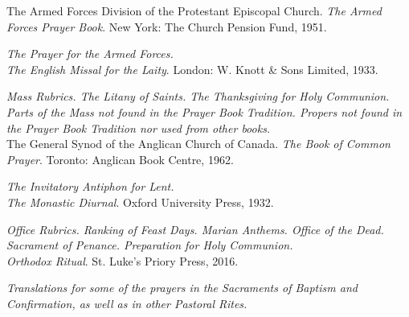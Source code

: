 The Armed Forces Division of the Protestant Episcopal Church. \textit{The Armed Forces Prayer Book}. New York: The Church Pension Fund, 1951.\par\noindent
\textit{The Prayer for the Armed Forces.}\\

\clearpage
\textit{The English Missal for the Laity}. London: W. Knott \& Sons Limited, 1933.\par\noindent
\textit{Mass Rubrics. The Litany of Saints. The Thanksgiving for Holy Communion. Parts of the Mass not found in the Prayer Book Tradition. Propers not found in the Prayer Book Tradition nor used from other books.}\\

The General Synod of the Anglican Church of Canada. \textit{The Book of Common Prayer}. Toronto: Anglican Book Centre, 1962.\par\noindent
\textit{The Invitatory Antiphon for Lent.}\\

\textit{The Monastic Diurnal}. Oxford University Press, 1932.\par\noindent
\textit{Office Rubrics. Ranking of Feast Days. Marian Anthems. Office of the Dead. Sacrament of Penance. Preparation for Holy Communion.}\\

\textit{Orthodox Ritual}. St. Luke's Priory Press, 2016.\par\noindent
\textit{Translations for some of the prayers in the Sacraments of Baptism and Confirmation, as well as in other Pastoral Rites.}
\clearpage